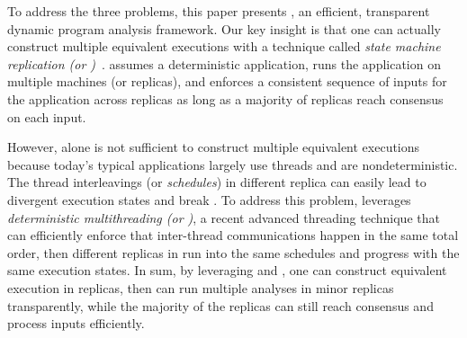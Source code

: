 

To address the three problems, this paper presents \xxx, an efficient, 
transparent dynamic program analysis framework. Our key insight is that one can 
actually construct multiple equivalent executions with a technique called 
\emph{state machine replication (or \smr)}~\cite{paxos:simple, 
paxos:practical}. \smr assumes a deterministic application, runs the 
application on multiple machines (or replicas), and enforces a consistent 
sequence of inputs for the application across replicas as long as a majority of 
replicas reach consensus on each input.


However, \smr alone is not sufficient to construct multiple equivalent 
executions because today's typical applications largely use threads and are 
nondeterministic. The thread interleavings (or \emph{schedules}) in different 
replica can easily lead to divergent execution states and break \smr. To 
address this problem, \xxx leverages \emph{deterministic multithreading (or 
\dmt)}, a recent advanced threading technique that can efficiently enforce that 
inter-thread communications happen in the same total order, then different 
replicas in \smr run into the same schedules and progress with the same 
execution states. In sum, by leveraging \smr and \dmt, one can construct 
equivalent execution in replicas, then \xxx can run multiple analyses in 
minor replicas transparently, while the majority of the replicas can still 
reach consensus and process inputs efficiently.


